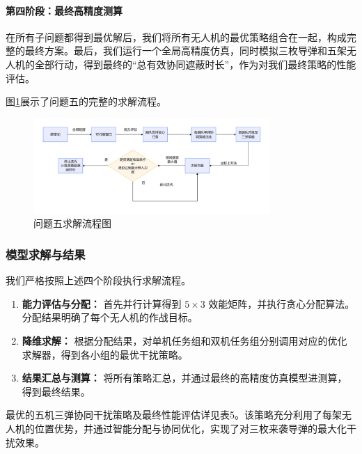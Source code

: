 \documentclass[12pt]{article}
\begin{document}
\begin{CJK}{UTF8}{gbsn}
		\paragraph{第四阶段：最终高精度测算}
		在所有子问题都得到最优解后，我们将所有无人机的最优策略组合在一起，构成完整的最终方案。最后，我们运行一个全局高精度仿真，同时模拟三枚导弹和五架无人机的全部行动，得到最终的“总有效协同遮蔽时长”，作为对我们最终策略的性能评估。
		
		图\ref{fig:flowchart_q5}展示了问题五的完整的求解流程。
		
		\begin{figure}[H]
			\centering
			\includegraphics[width=0.8\textwidth]{pic/Pb5.jpg}
			\caption{问题五求解流程图}
			\label{fig:flowchart_q5}
		\end{figure}
		
		
		\subsubsection{模型求解与结果}
		我们严格按照上述四个阶段执行求解流程。
		\begin{enumerate}
			\item \textbf{能力评估与分配：} 首先并行计算得到 $5 \times 3$ 效能矩阵，并执行贪心分配算法。分配结果明确了每个无人机的作战目标。
			\item \textbf{降维求解：} 根据分配结果，对单机任务组和双机任务组分别调用对应的优化求解器，得到各小组的最优干扰策略。
			\item \textbf{结果汇总与测算：} 将所有策略汇总，并通过最终的高精度仿真模型进测算，得到最终结果。
		\end{enumerate}
		最优的五机三弹协同干扰策略及最终性能评估详见表5。该策略充分利用了每架无人机的位置优势，并通过智能分配与协同优化，实现了对三枚来袭导弹的最大化干扰效果。
		

\end{CJK}
\end{document}

